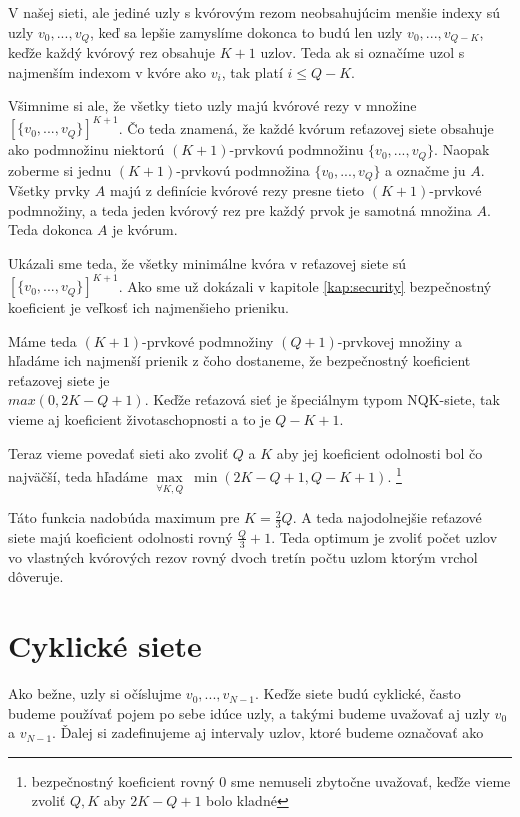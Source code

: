V našej sieti, ale jediné uzly s kvórovým rezom neobsahujúcim menšie indexy
sú uzly $v_0, ..., v_{Q}$, keď sa lepšie zamyslíme dokonca to budú len uzly
$v_0, ..., v_{Q-K}$, keďže každý kvórový rez obsahuje $K+1$ uzlov.
Teda ak si označíme uzol s najmenším indexom v kvóre ako $v_i$, tak platí
$i\leq Q-K$.

Všimnime si ale, že všetky tieto uzly majú kvórové rezy v množine $[\{v_0, ..., v_Q\}]^{K+1}$.
Čo teda znamená, že každé kvórum reťazovej siete obsahuje ako podmnožinu
niektorú $(K+1)$-prvkovú podmnožinu $\{v_0, ..., v_Q\}$.
Naopak zoberme si jednu $(K+1)$-prvkovú podmnožina $\{v_0, ..., v_Q\}$ a označme ju $A$.
Všetky prvky $A$ majú z definície kvórové rezy presne tieto $(K+1)$-prvkové podmnožiny,
a teda jeden kvórový rez pre každý prvok je samotná množina $A$. Teda dokonca $A$
je kvórum.

Ukázali sme teda, že všetky minimálne kvóra v reťazovej siete sú $[\{v_0, ..., v_Q\}]^{K+1}$.
Ako sme už dokázali v kapitole \ref{kap:security} bezpečnostný koeficient je
veľkosť ich najmenšieho prieniku.

Máme teda $(K+1)$-prvkové podmnožiny $(Q+1)$-prvkovej množiny a hľadáme ich
najmenší prienik z čoho dostaneme, že bezpečnostný koeficient
reťazovej siete je\\ $max (0,2K-Q+1)$.
Keďže reťazová sieť je špeciálnym typom NQK-siete, tak vieme aj
koeficient životaschopnosti a to je $Q-K+1$.

Teraz vieme povedať sieti ako zvoliť $Q$ a $K$ aby jej koeficient odolnosti bol
čo najväčší, teda hľadáme $\max\limits_{\forall K,Q} \: \min (2K-Q+1, Q-K+1)$.
\footnote{bezpečnostný koeficient rovný 0 sme nemuseli zbytočne uvažovať,
keďže vieme zvoliť $Q,K$ aby $2K-Q+1$ bolo kladné}

Táto funkcia nadobúda maximum pre $K = \frac{2}{3}Q$. A teda najodolnejšie
reťazové siete majú koeficient odolnosti rovný $\frac{Q}{3}+1$.
Teda optimum je zvoliť počet uzlov vo vlastných kvórových rezov rovný dvoch
tretín počtu uzlom ktorým vrchol dôveruje.

\section {Cyklické siete}

Ako bežne, uzly si očíslujme $v_0, ..., v_{N-1}$.
Keďže siete budú cyklické, často budeme používať pojem po sebe idúce uzly,
a takými budeme uvažovať aj uzly $v_0$ a $v_{N-1}$.
Ďalej si zadefinujeme aj intervaly uzlov, ktoré budeme označovať ako

